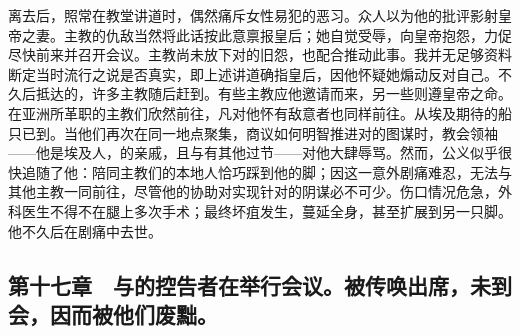 离去后，照常在教堂讲道时，偶然痛斥女性易犯的恶习。众人以为他的批评影射皇帝之妻。主教的仇敌当然将此话按此意禀报皇后；她自觉受辱，向皇帝抱怨，力促尽快前来并召开会议。主教尚未放下对的旧怨，也配合推动此事。我并无足够资料断定当时流行之说是否真实，即上述讲道确指皇后，因他怀疑她煽动反对自己。不久后抵达的，许多主教随后赶到。有些主教应他邀请而来，另一些则遵皇帝之命。在亚洲所革职的主教们欣然前往，凡对他怀有敌意者也同样前往。从埃及期待的船只已到。当他们再次在同一地点聚集，商议如何明智推进对的图谋时，教会领袖——他是埃及人，的亲戚，且与有其他过节——对他大肆辱骂。然而，公义似乎很快追随了他：陪同主教们的本地人恰巧踩到他的脚；因这一意外剧痛难忍，无法与其他主教一同前往，尽管他的协助对实现针对的阴谋必不可少。伤口情况危急，外科医生不得不在腿上多次手术；最终坏疽发生，蔓延全身，甚至扩展到另一只脚。他不久后在剧痛中去世。\par


\subsection{第十七章　与的控告者在举行会议。被传唤出席，未到会，因而被他们废黜。}

